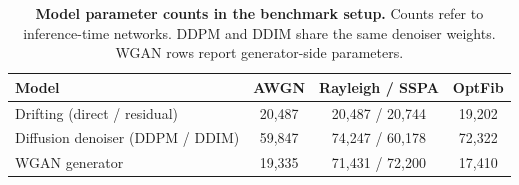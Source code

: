\begin{table}[t]
\centering
\caption{\textbf{Model parameter counts in the benchmark setup.} Counts refer to inference-time networks. DDPM and DDIM share the same denoiser weights. WGAN rows report generator-side parameters.}
\label{tab:model-size}
\tablefontsize
\begin{tabular}{@{}lccc@{}}
\toprule
Model & AWGN & Rayleigh / SSPA & OptFib \\
\midrule
Drifting (direct / residual) & 20{,}487 & 20{,}487 / 20{,}744 & 19{,}202 \\
Diffusion denoiser (DDPM / DDIM) & 59{,}847 & 74{,}247 / 60{,}178 & 72{,}322 \\
WGAN generator & 19{,}335 & 71{,}431 / 72{,}200 & 17{,}410 \\
\bottomrule
\end{tabular}
\end{table}
